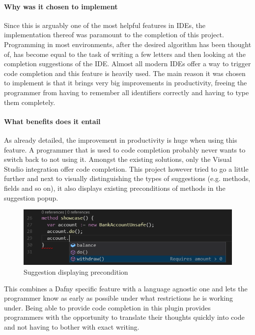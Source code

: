 \paragraph{Why was it chosen to implement}
Since this is arguably one of the most helpful features in IDEs, the implementation thereof was paramount to the completion of this project. Programming in most environments, after the desired algorithm has been thought of, has become equal to the task of writing a few letters and then looking at the completion suggestions of the IDE.  \newline
Almost all modern IDEs offer a way to trigger code completion and this feature is heavily used. The main reason it was chosen to implement is that it brings very big improvements in productivity, freeing the programmer from having to remember all identifiers correctly and having to type them completely.
\paragraph{What benefits does it entail}
As already detailed, the improvement in productivity is huge when using this feature. A programmer that is used to code completion probably never wants to switch back to not using it. Amongst the existing solutions, only the Visual Studio integration offer code completion. This project however tried to go a little further and next to visually distinguishing the types of suggestions (e.g. methods, fields and so on), it also displays existing preconditions of methods in the suggestion popup. \newline
\begin{figure}[H]
	\centering
	\includegraphics[width=1\textwidth]{img/codeCompletionMethod}
	\caption{Suggestion displaying precondition}
	\label{fig:agcodecompletionmethod}
\end{figure}
This combines a Dafny specific feature with a language agnostic one and lets the programmer know as early as possible under what restrictions he is working under. Being able to provide code completion in this plugin provides programmers with the opportunity to translate their thoughts quickly into code and not having to bother with exact writing.
